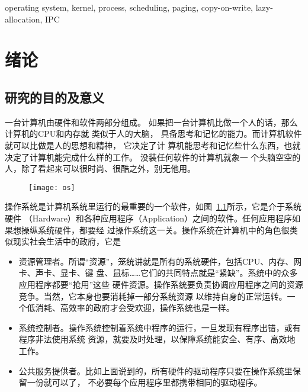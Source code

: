 \documentclass{swfuthesism}
\begin{document}
\begin{EKeyword}
  operating system, kernel, process, scheduling, paging, copy-on-write, lazy-allocation,
  IPC
\end{EKeyword}

\frontmatter          
\tableofcontents     %
\listoffigures       %
\listoflistings
\cleardoublepage %

\mainmatter{}

\chapter{绪论}

\section{研究的目的及意义}

一台计算机由硬件和软件两部分组成。 如果把一台计算机比做一个人的话，那么计算机的CPU和内存就
类似于人的大脑， 具备思考和记忆的能力。而计算机软件就可以比做是人的思想和精神， 它决定了计
算机能思考和记忆些什么东西，也就决定了计算机能完成什么样的工作。 没装任何软件的计算机就象一
个头脑空空的人，除了看起来可以很时尚、很酷之外，别无他用。

\begin{figure}
  \centering
  \texttt{[image: os]}
  \label{fig:os}
\end{figure}

操作系统是计算机系统里运行的最重要的一个软件，如图~\ref{fig:os}所示，它是介于系统硬件
（Hardware）和各种应用程序（Application）之间的软件。任何应用程序如果想操纵系统硬件，都要经
过操作系统这一关。操作系统在计算机中的角色很类似现实社会生活中的政府，它是
\begin{itemize}
\item 资源管理者。所谓“资源”，笼统讲就是所有的系统硬件，包括CPU、内存、网卡、声卡、显卡、键
  盘、鼠标\ldots{}\ldots{}它们的共同特点就是``紧缺''。系统中的众多应用程序都要``抢用''这些
  硬件资源。操作系统要负责协调应用程序之间的资源竞争。当然，它本身也要消耗掉一部分系统资源
  以维持自身的正常运转。一个低消耗、高效率的政府才会受欢迎，操作系统也是一样。
\item 系统控制者。操作系统控制着系统中程序的运行，一旦发现有程序出错，或有程序非法使用系统
  资源，就要及时处理，以保障系统能安全、有序、高效地工作。
\item 公共服务提供者。比如上面说到的，所有硬件的驱动程序只要在操作系统里保留一份就可以了，
  不必要每个应用程序里都携带相同的驱动程序。
\end{itemize}
\end{document}
